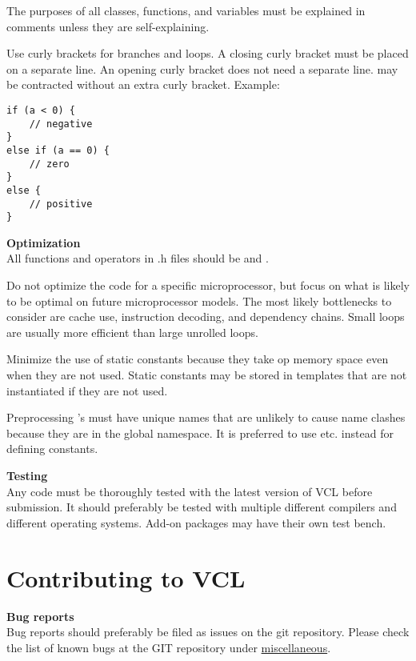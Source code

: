 \documentclass[vcl_manual.tex]{subfiles}
\begin{document}
The purposes of all classes, functions, and variables must be explained in comments unless they are self-explaining.

Use curly brackets for branches and loops. A closing curly bracket must be placed on a separate line. An opening curly bracket does not need a separate line.
 may be contracted without an extra curly bracket. Example:
\begin{lstlisting}[frame=none]
if (a < 0) {
    // negative
}
else if (a == 0) {
    // zero
}
else {
    // positive
}
\end{lstlisting}


\textbf{Optimization}\\

All functions and operators in .h files should be  and .

Do not optimize the code for a specific microprocessor, but focus on what is likely to be optimal on future microprocessor models. The most likely bottlenecks to consider are cache use, instruction decoding, and dependency chains. Small loops are usually more efficient than large unrolled loops.

Minimize the use of static constants because they take op memory space even when they are not used.
Static constants may be stored in templates that are not instantiated if they are not used.

Preprocessing 's must have unique names that are unlikely to cause name clashes because they are in the global namespace. It is preferred to use  etc. instead for defining constants.

\textbf{Testing}\\
Any code must be thoroughly tested with the latest version of VCL before submission.
It should preferably be tested with multiple different compilers and different operating systems.
Add-on packages may have their own test bench.


\section{Contributing to VCL}\label{Contributing}
\textbf{Bug reports}\\
Bug reports should preferably be filed as issues on the git repository. 
Please check the list of known bugs at the GIT repository under 
\href{https://github.com/vectorclass/miscellaneous}{miscellaneous}. 
\end{document}
